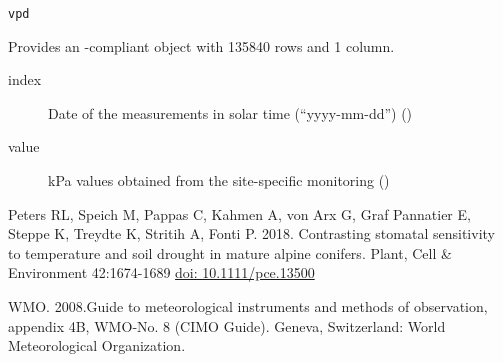 \documentclass[a4paper]{book}
\begin{document}
%
\begin{Usage}
\begin{verbatim}
vpd
\end{verbatim}
\end{Usage}
%
\begin{Format}
Provides an -compliant object with 135840 rows and 1 column.

\begin{description}

\item[index] Date of the measurements in solar time (“yyyy-mm-dd”) ()
\item[value] kPa values obtained from the site-specific monitoring ()

\end{description}
\end{Format}
%
\begin{References}\relax
Peters RL, Speich M, Pappas C, Kahmen A, von Arx G, Graf Pannatier E, Steppe K, Treydte K, Stritih A, Fonti P. 2018.
Contrasting stomatal sensitivity to temperature and soil drought in mature alpine conifers.
Plant, Cell \& Environment 42:1674-1689 \url{doi: 10.1111/pce.13500}

WMO. 2008.Guide to meteorological instruments and methods of observation, appendix 4B, WMO‐No. 8 (CIMO Guide).
Geneva, Switzerland: World Meteorological Organization.
\end{References}
\printindex{}
\end{document}
